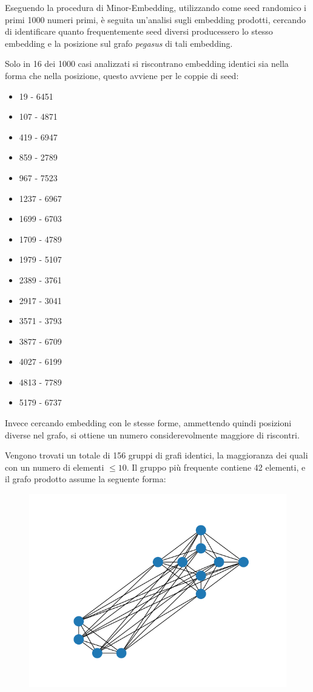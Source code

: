 \documentclass[12pt]{article}
\begin{document}
Eseguendo la procedura di Minor-Embedding, utilizzando come seed randomico i primi 1000 numeri primi, è seguita un'analisi sugli embedding prodotti,
cercando di identificare quanto frequentemente seed diversi producessero lo stesso embedding e la posizione sul grafo \emph{pegasus} di tali embedding.

Solo in 16 dei 1000 casi analizzati si riscontrano embedding identici sia nella forma che nella posizione, questo avviene per le coppie di seed:
\begin{multicols}{4}
  \begin{itemize}
    \item 19 - 6451
    \item 107 - 4871
    \item 419 - 6947
    \item 859 - 2789
    \item 967 - 7523
    \item 1237 - 6967
    \item 1699 - 6703
    \item 1709 - 4789
    \item 1979 - 5107
    \item 2389 - 3761
    \item 2917 - 3041
    \item 3571 - 3793
    \item 3877 - 6709
    \item 4027 - 6199
    \item 4813 - 7789
    \item 5179 - 6737
  \end{itemize}
\end{multicols}

Invece cercando embedding con le stesse forme, ammettendo quindi posizioni diverse nel grafo, si ottiene un numero considerevolmente maggiore di riscontri.

Vengono trovati un totale di 156 gruppi di grafi identici, la maggioranza dei quali con un numero di elementi $\leq 10$.
Il gruppo più frequente contiene 42 elementi, e il grafo prodotto assume la seguente forma:

\begin{figure}[H]
  \centering
  \includegraphics[width=\linewidth]{img/317.png}
\end{figure}
\end{document}
